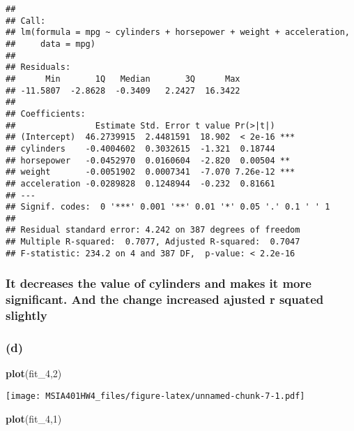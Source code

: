 \documentclass[
]{article}
\newenvironment{Shaded}{\begin{snugshade}}{\end{snugshade}}
\newcommand{\DecValTok}[1]{\textcolor[rgb]{0.00,0.00,0.81}{#1}}
\newcommand{\KeywordTok}[1]{\textcolor[rgb]{0.13,0.29,0.53}{\textbf{#1}}}
\newcommand{\NormalTok}[1]{#1}
\begin{document}
\begin{verbatim}
## 
## Call:
## lm(formula = mpg ~ cylinders + horsepower + weight + acceleration, 
##     data = mpg)
## 
## Residuals:
##      Min       1Q   Median       3Q      Max 
## -11.5807  -2.8628  -0.3409   2.2427  16.3422 
## 
## Coefficients:
##                Estimate Std. Error t value Pr(>|t|)    
## (Intercept)  46.2739915  2.4481591  18.902  < 2e-16 ***
## cylinders    -0.4004602  0.3032615  -1.321  0.18744    
## horsepower   -0.0452970  0.0160604  -2.820  0.00504 ** 
## weight       -0.0051902  0.0007341  -7.070 7.26e-12 ***
## acceleration -0.0289828  0.1248944  -0.232  0.81661    
## ---
## Signif. codes:  0 '***' 0.001 '**' 0.01 '*' 0.05 '.' 0.1 ' ' 1
## 
## Residual standard error: 4.242 on 387 degrees of freedom
## Multiple R-squared:  0.7077, Adjusted R-squared:  0.7047 
## F-statistic: 234.2 on 4 and 387 DF,  p-value: < 2.2e-16
\end{verbatim}

\hypertarget{it-decreases-the-value-of-cylinders-and-makes-it-more-significant.-and-the-change-increased-ajusted-r-squated-slightly}{%
\subsubsection{It decreases the value of cylinders and makes it more
significant. And the change increased ajusted r squated
slightly}\label{it-decreases-the-value-of-cylinders-and-makes-it-more-significant.-and-the-change-increased-ajusted-r-squated-slightly}}

\hypertarget{d}{%
\subsubsection{(d)}\label{d}}

\begin{Shaded}
\begin{Highlighting}[]
\KeywordTok{plot}\NormalTok{(fit_}\DecValTok{4}\NormalTok{,}\DecValTok{2}\NormalTok{)}
\end{Highlighting}
\end{Shaded}

\texttt{[image: MSIA401HW4\_files/figure-latex/unnamed-chunk-7-1.pdf]}

\begin{Shaded}
\begin{Highlighting}[]
\KeywordTok{plot}\NormalTok{(fit_}\DecValTok{4}\NormalTok{,}\DecValTok{1}\NormalTok{)}
\end{Highlighting}
\end{Shaded}
\end{document}
